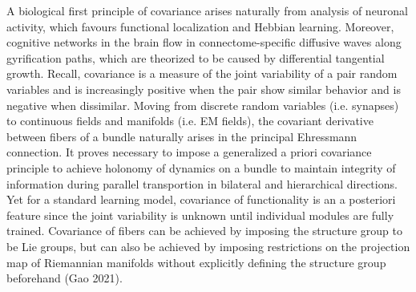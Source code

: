 \documentclass{article}
\begin{document}
   A biological first principle of covariance arises naturally from analysis of neuronal activity, which favours functional localization and Hebbian learning.
    Moreover, cognitive networks in the brain flow in connectome-specific diffusive waves along gyrification paths, which are theorized to be caused by differential tangential growth. 
    Recall, covariance is a measure of the joint variability of a pair random variables and is increasingly positive when the pair show similar behavior and is negative when dissimilar.
    Moving from discrete random variables (i.e. synapses) to continuous fields and manifolds (i.e. EM fields), the covariant derivative between fibers of a bundle naturally arises in the principal Ehressmann connection. It proves necessary to impose a generalized a priori covariance principle to achieve holonomy of dynamics on a bundle to maintain integrity of information during parallel transportion in bilateral and hierarchical directions.
    Yet for a standard learning model, covariance of functionality is an a posteriori feature since the joint variability is unknown until individual modules are fully trained. 
    Covariance of fibers can be achieved by imposing the structure group to be Lie groups, but can also be achieved by imposing restrictions on the projection map of Riemannian manifolds without explicitly defining the structure group beforehand (Gao 2021).


    
    
\end{document}
